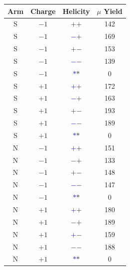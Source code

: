 \begin{table}
  \centering
  \begin{tabular}{cccc}
    \toprule
    \textbf{Arm} &
    \textbf{Charge} & 
    \textbf{Helicity} & 
    \textbf{$\mu$ Yield} \\ 
    \midrule
    S & $-1$ & \textbf{\textcolor{blue}{$+$}\textcolor{ucrgold}{$+$}}& 142 \\
    S & $-1$ & \textbf{\textcolor{blue}{$-$}\textcolor{ucrgold}{$+$}}& 169 \\
    S & $-1$ & \textbf{\textcolor{blue}{$+$}\textcolor{ucrgold}{$-$}}& 153 \\
    S & $-1$ & \textbf{\textcolor{blue}{$-$}\textcolor{ucrgold}{$-$}}& 139 \\
    S & $-1$ & \textbf{\textcolor{blue}{$*$}\textcolor{ucrgold}{$*$}}& 0 \\
    S & $+1$ & \textbf{\textcolor{blue}{$+$}\textcolor{ucrgold}{$+$}}& 172 \\
    S & $+1$ & \textbf{\textcolor{blue}{$-$}\textcolor{ucrgold}{$+$}}& 163 \\
    S & $+1$ & \textbf{\textcolor{blue}{$+$}\textcolor{ucrgold}{$-$}}& 193 \\
    S & $+1$ & \textbf{\textcolor{blue}{$-$}\textcolor{ucrgold}{$-$}}& 189 \\
    S & $+1$ & \textbf{\textcolor{blue}{$*$}\textcolor{ucrgold}{$*$}}& 0 \\
    N & $-1$ & \textbf{\textcolor{blue}{$+$}\textcolor{ucrgold}{$+$}}& 151 \\
    N & $-1$ & \textbf{\textcolor{blue}{$-$}\textcolor{ucrgold}{$+$}}& 133 \\
    N & $-1$ & \textbf{\textcolor{blue}{$+$}\textcolor{ucrgold}{$-$}}& 148 \\
    N & $-1$ & \textbf{\textcolor{blue}{$-$}\textcolor{ucrgold}{$-$}}& 147 \\
    N & $-1$ & \textbf{\textcolor{blue}{$*$}\textcolor{ucrgold}{$*$}}& 0 \\
    N & $+1$ & \textbf{\textcolor{blue}{$+$}\textcolor{ucrgold}{$+$}}& 180 \\
    N & $+1$ & \textbf{\textcolor{blue}{$-$}\textcolor{ucrgold}{$+$}}& 189 \\
    N & $+1$ & \textbf{\textcolor{blue}{$+$}\textcolor{ucrgold}{$-$}}& 159 \\
    N & $+1$ & \textbf{\textcolor{blue}{$-$}\textcolor{ucrgold}{$-$}}& 188 \\
    N & $+1$ & \textbf{\textcolor{blue}{$*$}\textcolor{ucrgold}{$*$}}& 0 \\

\end{tabular}
\end{table}
